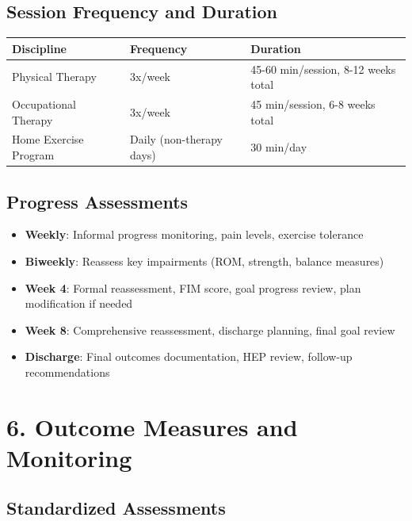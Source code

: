 \documentclass[11pt,letterpaper]{article}
\begin{document}
\subsection*{Session Frequency and Duration}

\begin{tabularx}{\textwidth}{|l|X|X|}
\hline
\textbf{Discipline} & \textbf{Frequency} & \textbf{Duration} \\ \hline
Physical Therapy & 3x/week & 45-60 min/session, 8-12 weeks total \\ \hline
Occupational Therapy & 3x/week & 45 min/session, 6-8 weeks total \\ \hline
Home Exercise Program & Daily (non-therapy days) & 30 min/day \\ \hline
\end{tabularx}

\subsection*{Progress Assessments}

\begin{itemize}[leftmargin=*]
    \item \textbf{Weekly}: Informal progress monitoring, pain levels, exercise tolerance
    \item \textbf{Biweekly}: Reassess key impairments (ROM, strength, balance measures)
    \item \textbf{Week 4}: Formal reassessment, FIM score, goal progress review, plan modification if needed
    \item \textbf{Week 8}: Comprehensive reassessment, discharge planning, final goal review
    \item \textbf{Discharge}: Final outcomes documentation, HEP review, follow-up recommendations
\end{itemize}

\section*{6. Outcome Measures and Monitoring}

\subsection*{Standardized Assessments}
\end{document}
